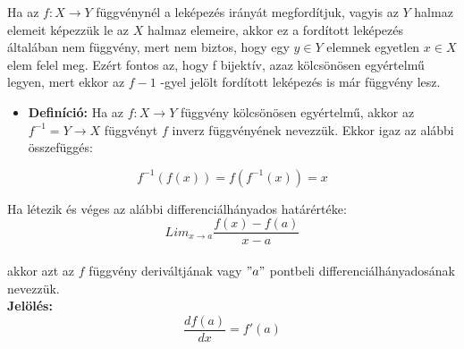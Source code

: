 \documentclass[11pt,a4paper]{article}
\begin{document}
\begin{tcolorbox}[colback=green!5!white,colframe=green!60!black,title= 4. Inverz függvény]
Ha az \(f:X \to Y\) függvénynél a leképezés irányát megfordítjuk, vagyis az \(Y\) halmaz elemeit
képezzük le az \(X\) halmaz elemeire, akkor ez a fordított leképezés általában nem függvény, mert nem biztos, hogy egy \(y \in Y\) elemnek egyetlen \(x \in X\) elem felel meg. Ezért fontos az, hogy f bijektív, azaz kölcsönösen egyértelmű legyen, mert ekkor az \(f-1\) -gyel jelölt fordított leképezés is már függvény lesz.    
    \begin{itemize}
        \item \textbf{Definíció:} Ha az \(f: X \to Y\) függvény kölcsönösen egyértelmű, akkor az \(f^{-1} = Y \to X\)
        függvényt \(f\) inverz függvényének nevezzük. Ekkor igaz az alábbi összefüggés:
    \end{itemize}
    $$f^{-1}(f(x)) = f(f^{-1}(x)) = x$$
\end{tcolorbox}

\begin{tcolorbox}[colback=green!5!white,colframe=green!60!black,title= 5. Derivált]
Ha létezik és véges az alábbi differenciálhányados határértéke:\\
$$Lim_{x\to a}\frac{f(x)-f(a)}{x-a}$$ \\
akkor azt az \(f\) függvény deriváltjának vagy \("a"\) pontbeli differenciálhányadosának nevezzük.\\ 
\textbf{Jelölés:} $$\frac{d f(a)}{d x} = f'(a)$$
\end{tcolorbox}
\end{document}
